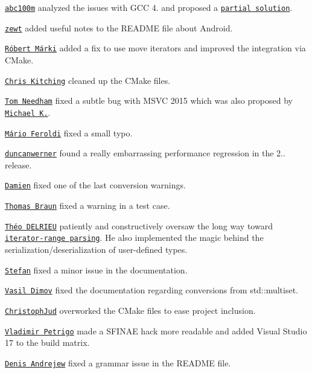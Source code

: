 \begin{DoxyItemize}
\item \href{https://github.com/abc100m}{\tt abc100m} analyzed the issues with G\+CC 4. and proposed a \href{https://github.com/nlohmann/json/pull/212}{\tt partial solution}.
\item \href{https://github.com/zewt}{\tt zewt} added useful notes to the R\+E\+A\+D\+ME file about Android.
\item \href{https://github.com/robertmrk}{\tt Róbert Márki} added a fix to use move iterators and improved the integration via C\+Make.
\item \href{https://github.com/ChrisKitching}{\tt Chris Kitching} cleaned up the C\+Make files.
\item \href{https://github.com/06needhamt}{\tt Tom Needham} fixed a subtle bug with M\+S\+VC 2015 which was also proposed by \href{https://github.com/Epidal}{\tt Michael K.}.
\item \href{https://github.com/thelostt}{\tt Mário Feroldi} fixed a small typo.
\item \href{https://github.com/duncanwerner}{\tt duncanwerner} found a really embarrassing performance regression in the 2.. release.
\item \href{https://github.com/dtoma}{\tt Damien} fixed one of the last conversion warnings.
\item \href{https://github.com/t-b}{\tt Thomas Braun} fixed a warning in a test case.
\item \href{https://github.com/theodelrieu}{\tt Théo D\+E\+L\+R\+I\+EU} patiently and constructively oversaw the long way toward \href{https://github.com/nlohmann/json/issues/290}{\tt iterator-\/range parsing}. He also implemented the magic behind the serialization/deserialization of user-\/defined types.
\item \href{https://github.com/5tefan}{\tt Stefan} fixed a minor issue in the documentation.
\item \href{https://github.com/vasild}{\tt Vasil Dimov} fixed the documentation regarding conversions from {\ttfamily std\+::multiset}.
\item \href{https://github.com/ChristophJud}{\tt Christoph\+Jud} overworked the C\+Make files to ease project inclusion.
\item \href{https://github.com/vpetrigo}{\tt Vladimir Petrigo} made a S\+F\+I\+N\+AE hack more readable and added Visual Studio 17 to the build matrix.
\item \href{https://github.com/seeekr}{\tt Denis Andrejew} fixed a grammar issue in the R\+E\+A\+D\+ME file.

\end{DoxyItemize}
